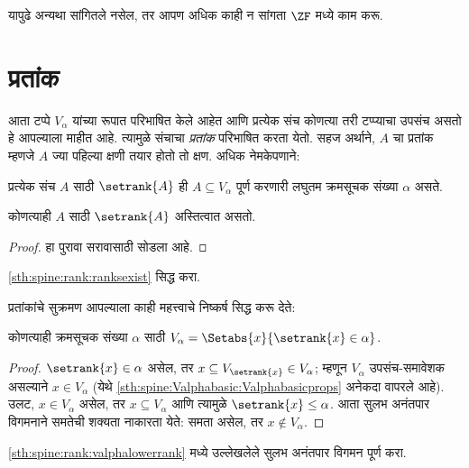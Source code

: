यापुढे अन्यथा सांगितले नसेल, तर आपण अधिक काही न सांगता $\ZF$ मध्ये काम करू.







\section{प्रतांक}\label{sth:spine:rank:sec}

आता टप्पे $V_\alpha$ यांच्या रूपात परिभाषित केले आहेत आणि प्रत्येक संच कोणत्या तरी टप्प्याचा उपसंच असतो हे आपल्याला माहीत आहे. त्यामुळे संचाचा \emph{प्रतांक} परिभाषित करता येतो. सहज अर्थाने, $A$ चा प्रतांक म्हणजे $A$ ज्या पहिल्या क्षणी तयार होतो तो क्षण. अधिक नेमकेपणाने:

\begin{defn}\label{sth:spine:rank:defnsetrank}
प्रत्येक संच $A$ साठी $\setrank{A}$ ही $A
\subseteq V_\alpha$ पूर्ण करणारी लघुतम क्रमसूचक संख्या $\alpha$ असते.
\end{defn}
\begin{prop}\label{sth:spine:rank:ranksexist}
	कोणत्याही $A$ साठी $\setrank{A}$ अस्तित्वात असतो.
\end{prop}
\begin{proof}
	हा पुरावा सरावासाठी सोडला आहे.
\end{proof}
\begin{prob}
	\ref{sth:spine:rank:ranksexist} सिद्ध करा.
\end{prob}
\noindent
प्रतांकांचे सुक्रमण आपल्याला काही महत्त्वाचे निष्कर्ष सिद्ध करू देते:
\begin{prop}\label{sth:spine:rank:valphalowerrank}
कोणत्याही क्रमसूचक संख्या $\alpha$ साठी $V_\alpha = \Setabs{x}{\setrank{x} \in \alpha}$.
\end{prop}

\begin{proof}
$\setrank{x} \in \alpha$ असेल, तर $x \subseteq V_{\setrank{x}} \in
V_\alpha$; म्हणून $V_\alpha$ उपसंच-समावेशक असल्याने $x \in V_\alpha$ (येथे \ref{sth:spine:Valphabasic:Valphabasicprops} अनेकदा वापरले आहे). उलट, $x \in V_\alpha$ असेल, तर $x \subseteq V_\alpha$ आणि त्यामुळे $\setrank{x} \leq \alpha$. आता सुलभ अनंतपार विगमनाने समतेची शक्यता नाकारता येते: समता असेल, तर $x \notin V_\alpha$.
\end{proof}
\begin{prob}
	\ref{sth:spine:rank:valphalowerrank} मध्ये उल्लेखलेले सुलभ अनंतपार विगमन पूर्ण करा.
\end{prob}

